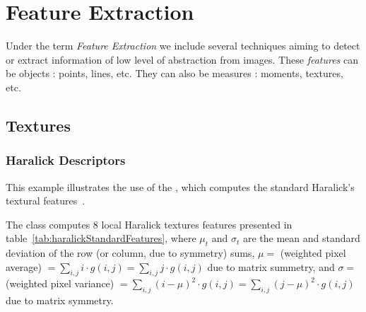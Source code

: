 \chapter{Feature Extraction}


Under the term {\em Feature Extraction} we include several techniques
aiming to detect or extract information of low level of abstraction
from images. These {\em features} can be objects : points, lines,
etc. They can also be measures : moments, textures, etc.

\section{Textures}
\subsection{Haralick Descriptors}

This example illustrates the use of the ,
which computes the standard Haralick's textural features~\cite{Haralick1973}.

The  class computes 8 local Haralick
textures features presented in table~\ref{tab:haralickStandardFeatures},
where $\mu_t$ and $\sigma_t$ are the mean and standard deviation of the row
(or column, due to symmetry) sums, $ \mu =  $ (weighted pixel average)
$ = \sum_{i,j}i \cdot g(i, j) =\sum_{i,j}j \cdot g(i, j) $ due to matrix summetry, and
$ \sigma =  $ (weighted pixel variance) $ = \sum_{i,j}(i - \mu)^2 \cdot g(i, j) =\sum_{i,j}(j - \mu)^2 \cdot g(i, j)  $
due to matrix symmetry.

